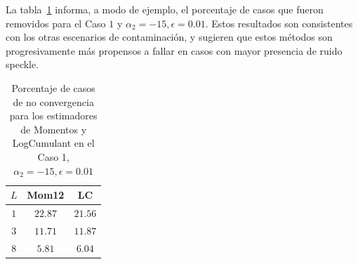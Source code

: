 La tabla~\ref{tabla_removidos} informa, a modo de ejemplo, el porcentaje de casos que fueron removidos para el Caso $1$ y $\alpha_2 = -15, \epsilon = 0.01$. Estos resultados son consistentes con los otras escenarios de contaminación, y sugieren que estos métodos son progresivamente más propensos a fallar en casos con mayor presencia de ruido speckle.

\begin{table}[hbt]
	\centering
	\begin{tabular}{ccc}
		\toprule
		$L$ & Mom12  & LC \\
		\midrule
		$1$ & $22.87$  & $21.56$ \\
		$3$ & $11.71$  &  $11.87$ \\
		$8$ & $5.81$ & $6.04$  \\
		\bottomrule
	\end{tabular}
\caption{\label{tabla_removidos}Porcentaje de casos de no convergencia para los estimadores de Momentos y LogCumulant en el Caso 1, $\alpha_2 = -15, \epsilon = 0.01$}
\end{table}


